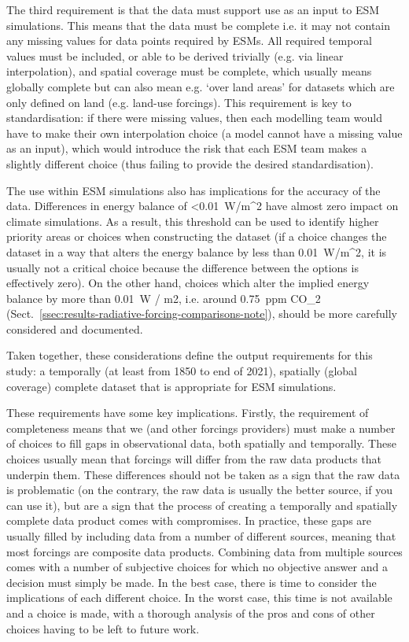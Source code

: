 The third requirement is that the data must support use as an input to ESM simulations.
This means that the data must be complete i.e. it may not contain any missing values for data points required by ESMs.
All required temporal values must be included, or able to be derived trivially (e.g. via linear interpolation),
and spatial coverage must be complete, which usually means globally complete
but can also mean e.g. `over land areas' for datasets which are only defined on land (e.g. land-use forcings).
This requirement is key to standardisation: if there were missing values,
then each modelling team would have to make their own interpolation choice
(a model cannot have a missing value as an input),
which would introduce the risk that each ESM team makes a slightly different choice
(thus failing to provide the desired standardisation).

The use within ESM simulations also has implications for the accuracy of the data.
Differences in energy balance of <0.01~W/m^2 have almost zero impact on climate simulations.
As a result, this threshold can be used to identify higher priority areas or choices
when constructing the dataset
(if a choice changes the dataset in a way that alters the energy balance by less than 0.01~W/m^2,
it is usually not a critical choice because the difference between the options is effectively zero).
On the other hand, choices which alter the implied energy balance by more than 0.01~W / m2,
i.e. around 0.75~ppm CO_2 (Sect.~\ref{ssec:results-radiative-forcing-comparisons-note}),
should be more carefully considered and documented.

Taken together, these considerations define the output requirements for this study:
a temporally (at least from 1850 to end of 2021),
spatially (global coverage) complete dataset
that is appropriate for ESM simulations.

These requirements have some key implications.
Firstly, the requirement of completeness means that
we (and other forcings providers)
must make a number of choices to fill gaps in observational data, both spatially and temporally.
These choices usually mean that forcings will differ from the raw data products that underpin them.
These differences should not be taken as a sign that the raw data is problematic
(on the contrary, the raw data is usually the better source, if you can use it),
but are a sign that the process of creating a temporally and spatially complete data product comes with compromises.
In practice, these gaps are usually filled by including data from a number of different sources,
meaning that most forcings are composite data products.
Combining data from multiple sources comes with a number of subjective choices
for which no objective answer and a decision must simply be made.
In the best case, there is time to consider the implications of each different choice.
In the worst case, this time is not available and a choice is made,
with a thorough analysis of the pros and cons of other choices having to be left to future work.

